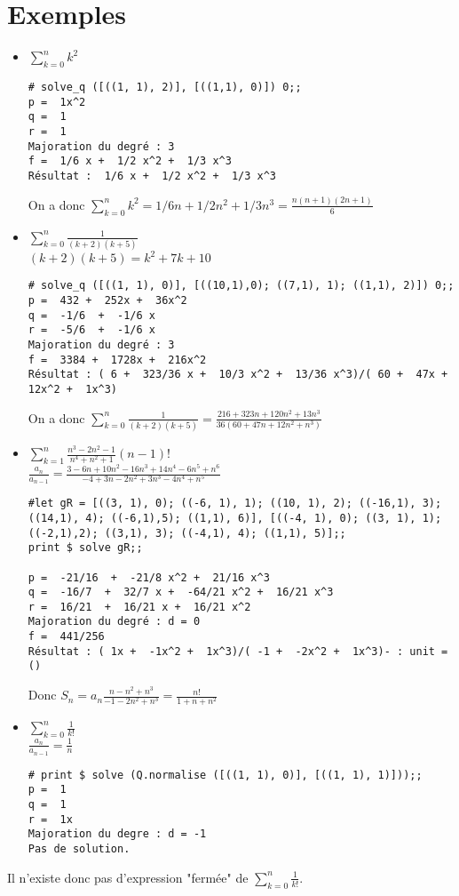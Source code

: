 \documentclass[17 pt,french]{scrartcl}
\begin{document}
  	\section*{Exemples}
  	 	\begin{itemize}
    		\item $\sum_{k=0}^n k^2$\\
    		\begin{lstlisting}
# solve_q ([((1, 1), 2)], [((1,1), 0)]) 0;;
p =  1x^2
q =  1
r =  1
Majoration du degré : 3
f =  1/6 x +  1/2 x^2 +  1/3 x^3
Résultat :  1/6 x +  1/2 x^2 +  1/3 x^3
    		\end{lstlisting}
    		On a donc $\sum_{k=0}^n k^2 = 1/6 n +  1/2 n^2 +  1/3 n^3 = \frac{n(n+1)(2n+1)}{6}$
    		
    		\item $\sum_{k=0}^n \frac{1}{(k+2)(k+5)}$\\
    		$(k+2)(k+5) = k^2+7k+10$ 
    		\begin{lstlisting}
# solve_q ([((1, 1), 0)], [((10,1),0); ((7,1), 1); ((1,1), 2)]) 0;;
p =  432 +  252x +  36x^2
q =  -1/6  +  -1/6 x
r =  -5/6  +  -1/6 x
Majoration du degré : 3
f =  3384 +  1728x +  216x^2
Résultat : ( 6 +  323/36 x +  10/3 x^2 +  13/36 x^3)/( 60 +  47x +  12x^2 +  1x^3)
    		\end{lstlisting}
    		On a donc $\sum_{k=0}^n \frac{1}{(k+2)(k+5)} = \frac{216+323 n+120 n^2+13 n^3}{36 \left(60+47 n+12 n^2+n^3\right)}$
    		
    	\newpage
    		\item $ \sum_{k=1}^n {\frac{n^3-2n^2-1}{n^4+n^2+1}(n-1)!}$ \\
    		$\frac{a_n}{a_{n-1}} = \frac{3-6 n+10 n^2-16 n^3+14 n^4-6 n^5+n^6}{-4+3 n-2 n^2+3 n^3-4 n^4+n^5} $ \\
    		\begin{lstlisting}
#let gR = [((3, 1), 0); ((-6, 1), 1); ((10, 1), 2); ((-16,1), 3); ((14,1), 4); ((-6,1),5); ((1,1), 6)], [((-4, 1), 0); ((3, 1), 1); ((-2,1),2); ((3,1), 3); ((-4,1), 4); ((1,1), 5)];;
print $ solve gR;;
    		
p =  -21/16  +  -21/8 x^2 +  21/16 x^3
q =  -16/7  +  32/7 x +  -64/21 x^2 +  16/21 x^3
r =  16/21  +  16/21 x +  16/21 x^2
Majoration du degré : d = 0
f =  441/256 
Résultat : ( 1x +  -1x^2 +  1x^3)/( -1 +  -2x^2 +  1x^3)- : unit = ()
    		\end{lstlisting}
    		Donc $S_n = a_n\frac{n - n^2 + n^3}{-1 - 2 n^2 + n^3} = \frac{n!}{1+n+n^2}$
    		
    		\item $\sum_{k=0}^n \frac{1}{k!}$\\
    		$\frac{a_n}{a_{n-1}} = \frac{1}{n}$\\
    		\begin{lstlisting}
# print $ solve (Q.normalise ([((1, 1), 0)], [((1, 1), 1)]));;
p =  1
q =  1
r =  1x
Majoration du degre : d = -1
Pas de solution.
    		\end{lstlisting}   		
    		\end{itemize}
	Il n'existe donc pas d'expression "fermée" de $\sum_{k=0}^n \frac{1}{k!}$.
\end{document}
